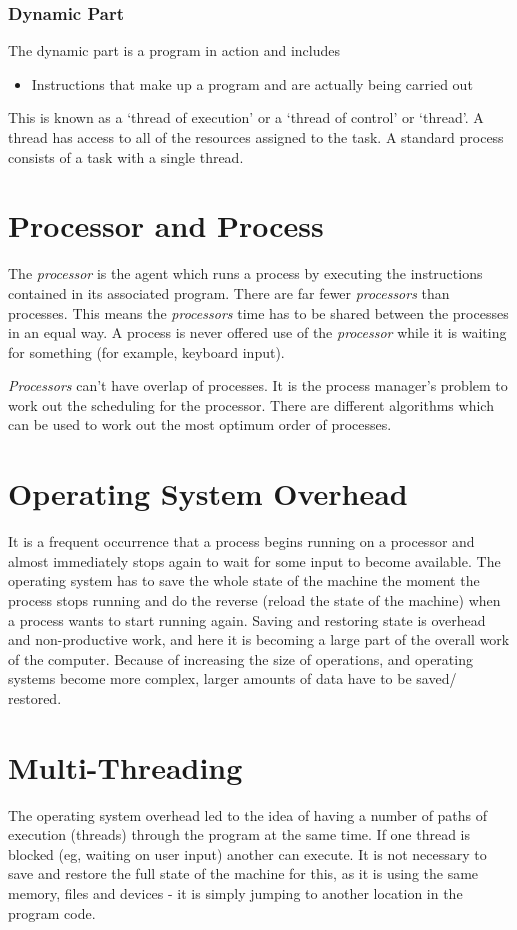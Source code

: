 \subsubsection*{Dynamic Part}
The dynamic part is a program in action and includes
\begin{itemize}
    \item Instructions that make up a program and are actually being carried out
\end{itemize}
This is known as a `thread of execution' or a `thread of control' or `thread'. A thread has access to all of the resources assigned to the task. A standard process consists of a task with a single thread.

\section*{Processor and Process}
The \textit{processor} is the agent which runs a process by executing the instructions contained in its associated program. There are far fewer \textit{processors} than processes. This means the \textit{processors} time has to be shared between the processes in an equal way. A process is never offered use of the \textit{processor} while it is waiting for something (for example, keyboard input). 

\textit{Processors} can't have overlap of processes. It is the process manager's problem to work out the scheduling for the processor. There are different algorithms which can be used to work out the most optimum order of processes. 

\section*{Operating System Overhead}
It is a frequent occurrence that a process begins running on a processor and almost immediately stops again to wait for some input to become available. The operating system has to save the whole state of the machine the moment the process stops running and do the reverse (reload the state of the machine) when a process wants to start running again. Saving and restoring state is overhead and non-productive work, and here it is becoming a large part of the overall work of the computer. Because of increasing the size of operations, and operating systems become more complex, larger amounts of data have to be saved/ restored. 

\section*{Multi-Threading}
The operating system overhead led to the idea of having a number of paths of execution (threads) through the program at the same time. If one thread is blocked (eg, waiting on user input) another can execute. It is not necessary to save and restore the full state of the machine for this, as it is using the same memory, files and devices - it is simply jumping to another location in the program code.

